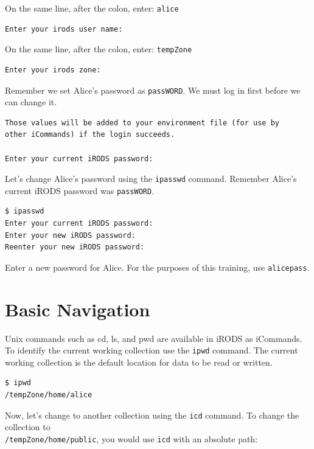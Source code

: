 \documentclass[10pt,oneside]{memoir}
\begin{document}
On the same line, after the colon, enter: \texttt{alice}

\begin{lstlisting}[basicstyle=\scriptsize\ttfamily]
Enter your irods user name:
\end{lstlisting}

\newpage

On the same line, after the colon, enter: \texttt{tempZone}

\begin{lstlisting}[basicstyle=\scriptsize\ttfamily]
Enter your irods zone:
\end{lstlisting}

Remember we set Alice's password as \texttt{passWORD}. We must log in first before we can change it.

\begin{lstlisting}[basicstyle=\scriptsize\ttfamily]
Those values will be added to your environment file (for use by
other iCommands) if the login succeeds.

Enter your current iRODS password:
\end{lstlisting}


Let's change Alice's password using the \texttt{ipasswd} command. Remember Alice's current iRODS password was \texttt{passWORD}.

\begin{lstlisting}
$ ipasswd
Enter your current iRODS password:
Enter your new iRODS password:
Reenter your new iRODS password:
\end{lstlisting}

Enter a new password for Alice. For the purposes of this training, use \texttt{alicepass}.

\section{Basic Navigation}

Unix commands such as cd, ls, and pwd are available in iRODS as iCommands. To identify the current working collection use the \texttt{ipwd} command. The current working collection is the default location for data to be read or written.

\begin{lstlisting}
$ ipwd
/tempZone/home/alice
\end{lstlisting}

Now, let's change to another collection using the \texttt{icd} command. To change the collection to \\ \texttt{/tempZone/home/public}, you would use \texttt{icd} with an absolute path:
\end{document}
